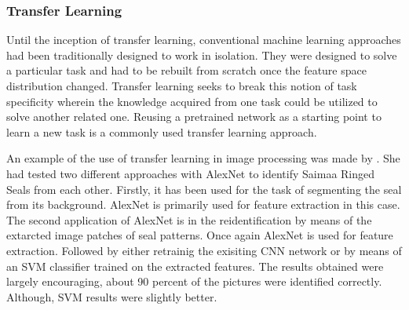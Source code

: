 \documentclass[doc/report.tex]{subfiles}
\begin{document}
\subsubsection{Transfer Learning}
Until the inception of transfer learning, conventional machine learning
approaches had been traditionally designed to work in isolation. They were
designed to solve a particular task and had to be rebuilt from scratch once the
feature space distribution changed. Transfer learning seeks to break this
notion of task specificity wherein the knowledge acquired from one task could
be utilized to solve another related one. Reusing a pretrained network as a
starting point to learn a new task is a commonly used transfer learning
approach.

An example of the use of transfer learning in image processing was made by
\cite{Ekat}. She had tested two different approaches with AlexNet to identify
Saimaa Ringed Seals from each other. Firstly, it has been used for the task of
segmenting the seal from its background. AlexNet is primarily used for feature
extraction in this case. The second application of AlexNet is in the
reidentification by means of the extarcted image patches of seal patterns. Once
again AlexNet is used for feature extraction. Followed by either retrainig the
exisiting CNN network or by means of an SVM classifier trained on the extracted
features. The results obtained were largely encouraging, about 90 percent of
the pictures were identified correctly. Although, SVM results were slightly
better.
    
\end{document}
